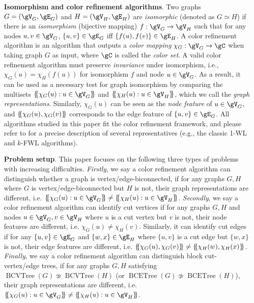 \documentclass{article} %
\let\cref\crtcref
\newcommand*{\ldblbrace}{\{\mskip-5mu\{}
\newcommand*{\rdblbrace}{\}\mskip-5mu\}}
\begin{document}
\textbf{Isomorphism and color refinement algorithms}. Two graphs $G=(\gV_G,\gE_G)$ and $H=(\gV_H,\gE_H)$ are \emph{isomorphic} (denoted as $G\simeq H$) if there is an \emph{isomorphism} (bijective mapping) $f:\gV_G\to\gV_H$ such that for any nodes $u,v\in\gV_G$, $\{u,v\}\in\gE_G$ iff $\{f(u),f(v)\}\in\gE_H$. A color refinement algorithm is an algorithm that outputs a \emph{color mapping} $\chi_G:\gV_G\to\gC$ when taking graph $G$ as input, where $\gC$ is called the \emph{color set}. A valid color refinement algorithm must preserve \emph{invariance} under isomorphism, i.e., $\chi_G(u)=\chi_H(f(u))$ for isomorphism $f$ and node $u\in\gV_G$. As a result, it can be used as a necessary test for graph isomorphism by comparing the multisets $\ldblbrace \chi_G(u):u\in\gV_G\rdblbrace$ and $\ldblbrace \chi_H(u):u\in\gV_H\rdblbrace$, which we call the \emph{graph representations}. Similarly, $\chi_G(u)$ can be seen as the \emph{node feature} of $u\in\gV_G$, and $\ldblbrace \chi_G(u),\chi_G(v)\rdblbrace$ corresponds to the {edge feature} of $\{u,v\}\in\gE_G$. All algorithms studied in this paper fit the color refinement framework, and please refer to \cref{sec:algorithms} for a precise description of several representatives (e.g., the classic 1-WL and $k$-FWL algorithms).

\textbf{Problem setup}. This paper focuses on the following three types of problems with increasing difficulties. \emph{Firstly}, we say a color refinement algorithm can distinguish whether a graph is vertex/edge-biconnected, if for any graphs $G,H$ where $G$ is vertex/edge-biconnected but $H$ is not, their graph representations are different, i.e. $\ldblbrace \chi_G(u):u\in\gV_G\rdblbrace\neq\ldblbrace \chi_H(u):u\in\gV_H\rdblbrace$. \emph{Secondly}, we say a color refinement algorithm can identify cut vertices if for any graphs $G, H$ and nodes $u\in\gV_G,v\in\gV_H$ where $u$ is a cut vertex but $v$ is not, their node features are different, i.e. $\chi_G(u)\neq \chi_H(v)$. Similarly, it can identify cut edges if for any $\{u,v\}\in\gE_G$ and $\{w,x\}\in\gE_H$ where $\{u,v\}$ is a cut edge but $\{w,x\}$ is not, their edge features are different, i.e. $\ldblbrace\chi_G(u),\chi_G(v)\rdblbrace\neq \ldblbrace\chi_H(w),\chi_H(x)\rdblbrace$. \emph{Finally}, we say a color refinement algorithm can distinguish block cut-vertex/edge trees, if for any graphs $G,H$ satisfying $\operatorname{BCVTree}(G)\not\simeq\operatorname{BCVTree}(H)$ (or $\operatorname{BCETree}(G)\not\simeq\operatorname{BCETree}(H)$), their graph representations are different, i.e. $\ldblbrace \chi_G(u):u\in\gV_G\rdblbrace\neq\ldblbrace \chi_H(u):u\in\gV_H\rdblbrace$.
\end{document}
